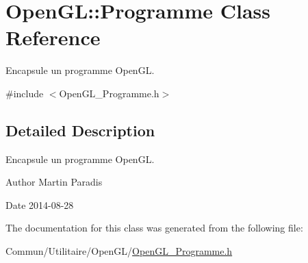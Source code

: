 \hypertarget{class_open_g_l_1_1_programme}{}\section{Open\+G\+L\+:\+:Programme Class Reference}
\label{class_open_g_l_1_1_programme}


Encapsule un programme Open\+G\+L.  




{\ttfamily \#include $<$Open\+G\+L\+\_\+\+Programme.\+h$>$}



\subsection{Detailed Description}
Encapsule un programme Open\+G\+L. 

\begin{DoxyAuthor}{Author}
Martin Paradis 
\end{DoxyAuthor}
\begin{DoxyDate}{Date}
2014-\/08-\/28 
\end{DoxyDate}


The documentation for this class was generated from the following file\+:\begin{DoxyCompactItemize}
\item 
Commun/\+Utilitaire/\+Open\+G\+L/\hyperlink{_open_g_l___programme_8h}{Open\+G\+L\+\_\+\+Programme.\+h}\end{DoxyCompactItemize}
